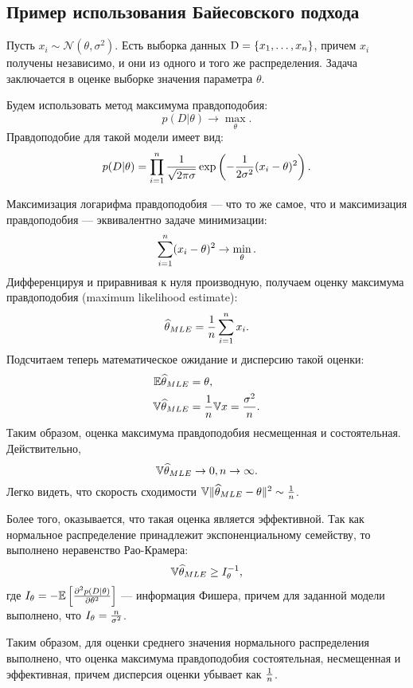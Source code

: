 \subsection{Пример использования Байесовского подхода}
\begin{example}
Пусть $x_i \sim \mathcal{N}(\theta, \sigma^2)$.
Есть выборка данных $\mathrm{D} = \{x_1, \ldots, x_{n}\}$, причем $x_i$ получены независимо, и они из одного и того же распределения.
Задача заключается в оценке выборке значения параметра $\theta$.

Будем использовать метод максимума правдоподобия:
\[
p(D| \theta) \rightarrow \max_{\theta}.
\]
Правдоподобие для такой модели имеет вид:
\[
p(D| \theta) = \prod_{i = 1}^{n} \frac{1}{\sqrt{2 \pi \sigma}} \exp \left(-\frac{1}{2 \sigma^2} (x_i - \theta)^2 \right).
\]

Максимизация логарифма правдоподобия --- что то же самое, что и максимизация правдоподобия --- эквивалентно задаче минимизации:
\[
\sum_{i = 1}^{n} (x_i - \theta)^2 \rightarrow \min_{\theta}.
\]
Дифференцируя и приравнивая к нуля производную, получаем оценку максимума правдоподобия (maximum likelihood estimate):
\[
\widehat{\theta}_{MLE} = \frac{1}{n} \sum_{i = 1}^{n} x_i.
\]
Подсчитаем теперь математическое ожидание и дисперсию такой оценки:
\begin{align*}
\mathbb{E} \widehat{\theta}_{MLE} &= \theta, \\
\mathbb{V} \widehat{\theta}_{MLE} &= \frac{1}{n} \mathbb{V} x = \frac{\sigma^2}{n}. \\
\end{align*}
Таким образом, оценка максимума правдоподобия несмещенная и состоятельная.
Действительно, 
\[
\mathbb{V} \widehat{\theta}_{MLE} \rightarrow 0, n \rightarrow \infty.
\]
Легко видеть, что скорость сходимости $\mathbb{V} \|\widehat{\theta}_{MLE} - \theta\|^2 \sim \frac{1}{n}$.

Более того, оказывается, что такая оценка является эффективной.
Так как нормальное распределение принадлежит экспоненциальному семейству, то выполнено неравенство Рао-Крамера:
\[
\mathbb{V} \widehat{\theta}_{MLE} \geq I_{\theta}^{-1},
\]
где $I_{\theta} = - \mathbb{E}  \left[\frac{\partial^2 p(D|\theta)}{\partial \theta^2} \right]$ --- информация Фишера,
причем для заданной модели выполнено, что $I_{\theta} = \frac{n}{\sigma^2}$.

Таким образом, для оценки среднего значения нормального распределения выполнено, что
оценка максимума правдоподобия состоятельная, несмещенная и эффективная, причем 
дисперсия оценки убывает как $\frac{1}{n}$.


\end{example}

